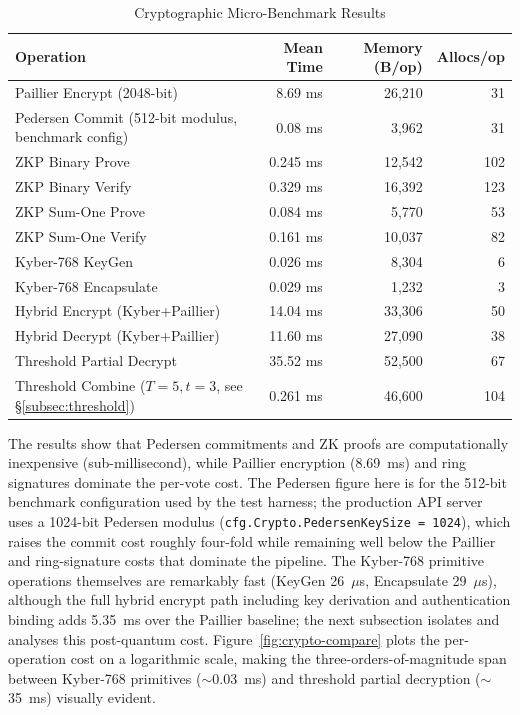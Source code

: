 \begin{table}[H]
\centering
\caption{Cryptographic Micro-Benchmark Results}
\label{tab:micro}
\small
\begin{tabular}{|l|r|r|r|}
\hline
\textbf{Operation} & \textbf{Mean Time} & \textbf{Memory (B/op)} & \textbf{Allocs/op} \\
\hline
Paillier Encrypt (2048-bit) & 8.69 ms & 26,210 & 31 \\
\hline
Pedersen Commit (512-bit modulus, benchmark config) & 0.08 ms & 3,962 & 31 \\
\hline
ZKP Binary Prove & 0.245 ms & 12,542 & 102 \\
\hline
ZKP Binary Verify & 0.329 ms & 16,392 & 123 \\
\hline
ZKP Sum-One Prove & 0.084 ms & 5,770 & 53 \\
\hline
ZKP Sum-One Verify & 0.161 ms & 10,037 & 82 \\
\hline
Kyber-768 KeyGen & 0.026 ms & 8,304 & 6 \\
\hline
Kyber-768 Encapsulate & 0.029 ms & 1,232 & 3 \\
\hline
Hybrid Encrypt (Kyber+Paillier) & 14.04 ms & 33,306 & 50 \\
\hline
Hybrid Decrypt (Kyber+Paillier) & 11.60 ms & 27,090 & 38 \\
\hline
Threshold Partial Decrypt & 35.52 ms & 52,500 & 67 \\
\hline
Threshold Combine ($T{=}5, t{=}3$, see \S\ref{subsec:threshold}) & 0.261 ms & 46,600 & 104 \\
\hline
\end{tabular}
\end{table}

The results show that Pedersen commitments and ZK proofs are computationally inexpensive (sub-millisecond), while Paillier encryption (8.69~ms) and ring signatures dominate the per-vote cost. The Pedersen figure here is for the 512-bit benchmark configuration used by the test harness; the production API server uses a 1024-bit Pedersen modulus (\texttt{cfg.Crypto.PedersenKeySize = 1024}), which raises the commit cost roughly four-fold while remaining well below the Paillier and ring-signature costs that dominate the pipeline. The Kyber-768 primitive operations themselves are remarkably fast (KeyGen 26~$\mu$s, Encapsulate 29~$\mu$s), although the full hybrid encrypt path including key derivation and authentication binding adds 5.35~ms over the Paillier baseline; the next subsection isolates and analyses this post-quantum cost. Figure~\ref{fig:crypto-compare} plots the per-operation cost on a logarithmic scale, making the three-orders-of-magnitude span between Kyber-768 primitives ($\sim$0.03~ms) and threshold partial decryption ($\sim$35~ms) visually evident.

